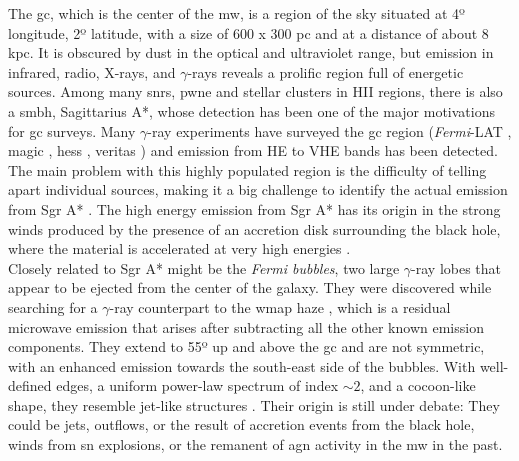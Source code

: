 \documentclass[main.tex]{subfiles}
\begin{document}
The \gls{gc}, which is the center of the \gls{mw}, is a region of the sky situated at 4º longitude, 2º latitude, with a size of 600 x 300 pc and at a distance of about 8 kpc. It is obscured by dust in the optical and ultraviolet range, but emission in infrared, radio, X-rays, and $\gamma$-rays reveals a prolific region full of energetic sources. Among many \glspl{snr}, \gls{pwne} and stellar clusters in HII regions, there is also a \gls{smbh}, Sagittarius A*, whose detection has been one of the major motivations for \gls{gc} surveys. Many $\gamma$-ray experiments have surveyed the \gls{gc} region (\textit{Fermi}-LAT , \gls{magic} \cite{2006GCMAGIC}, \gls{hess} \cite{2018GPHESS}, \gls{veritas} \cite{2016GCveritas}) and emission from HE to VHE bands has been detected. The main problem with this highly populated region is the difficulty of telling apart individual sources, making it a big challenge to identify the actual emission from  Sgr A* \cite{2011GC}. The high energy emission from Sgr A* has its origin in the strong winds produced by the presence of an accretion disk surrounding the black hole, where the material is accelerated at very high energies \cite{2007GC}.\\
Closely related to Sgr A* might be the \textit{Fermi bubbles}, two large $\gamma$-ray lobes that appear to be ejected from the center of the galaxy. They were discovered while searching for a $\gamma$-ray counterpart to the \gls{wmap} haze \cite{2010Afbubblesdiscovery}, which is a residual microwave emission that arises after subtracting all the other known emission components. They extend to 55º up and above the \gls{gc} and are not symmetric, with an enhanced emission towards the south-east side of the bubbles. With well-defined edges, a uniform power-law spectrum of index $\sim 2$, and a cocoon-like shape, they resemble jet-like structures \cite{2014Fbubbles}. Their origin is still under debate: They could be jets, outflows, or the result of accretion events from the black hole, winds from \gls{sn} explosions, or the remanent of \gls{agn} activity in the \gls{mw} in the past. 
\end{document}
